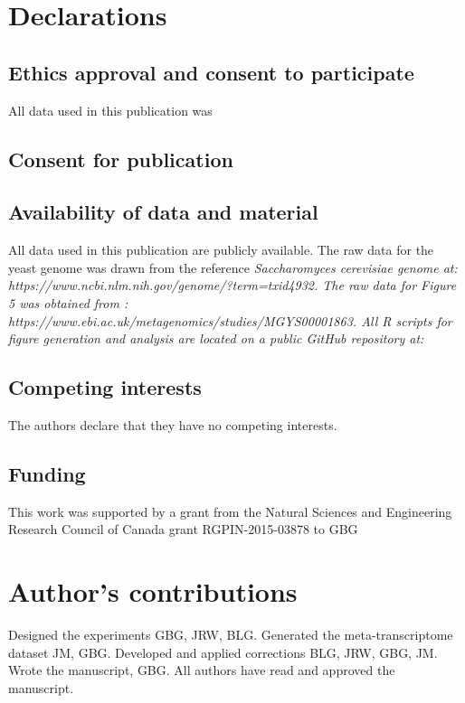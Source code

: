 \documentclass{bmcart}
\begin{document}
\begin{backmatter}

\section*{Declarations} 
\subsection*{Ethics approval and consent to participate}
All data used in this publication was 
\subsection*{Consent for publication}

\subsection*{Availability of data and material}
All data used in this publication are publicly available. The raw data for the yeast genome was drawn from the reference \em{Saccharomyces cerevisiae} genome at: https://www.ncbi.nlm.nih.gov/genome/?term=txid4932. The raw data for Figure 5 was obtained from : https://www.ebi.ac.uk/metagenomics/studies/MGYS00001863. All R scripts for figure generation and analysis are located on a public GitHub repository at: 
\subsection*{Competing interests}
 The authors declare that they have no competing interests.
  
\subsection*{Funding}
This work was supported by a grant from the Natural Sciences and Engineering Research Council of Canada grant RGPIN-2015-03878 to GBG

\section*{Author's contributions}
    Designed the experiments GBG, JRW, BLG. Generated the meta-transcriptome dataset JM, GBG. Developed and applied corrections BLG, JRW, GBG, JM. Wrote the manuscript, GBG. All authors have read and approved the manuscript.


\end{backmatter}
\end{document}
